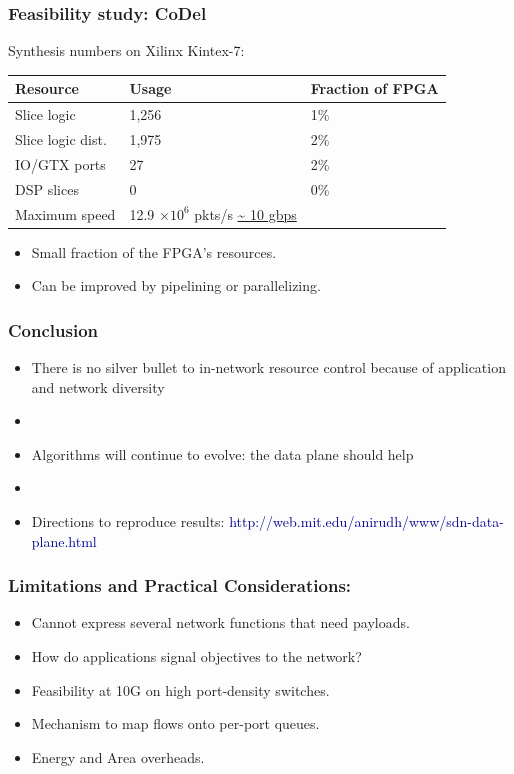 \begin{Large}
\begin{frame}[plain]
\frametitle{Feasibility study: CoDel}
\begin{center}
Synthesis numbers on Xilinx Kintex-7: \\
\begin{tabular}{lll}
\bf Resource & \bf Usage & \bf Fraction of FPGA \\
\hline Slice logic & 1,256 & 1\% \\
Slice logic dist. & 1,975 & 2\% \\
IO/GTX ports & 27 & 2\% \\
DSP slices & 0 & 0\% \\
Maximum speed & 12.9 $\times 10^6$ pkts/s \url{~ 10 gbps} \\
\end{tabular}
\end{center}
\begin{itemize}
\item Small fraction of the FPGA's resources.
\item Can be improved by pipelining or parallelizing.
\end{itemize}
\end{frame}

\begin{frame}[plain]

\frametitle{Conclusion}
\begin{itemize}

\item There is no silver bullet to in-network resource control because
  of application and network diversity

\item[]
\item Algorithms will continue to evolve: the data plane should help

\item[]
\item Directions to reproduce results: \textcolor{DarkBlue}{http://web.mit.edu/anirudh/www/sdn-data-plane.html} 

\end{itemize}
\end{frame}


\begin{frame}[plain]
\frametitle{Limitations and Practical Considerations:}
\begin{itemize}
\item Cannot express several network functions that need payloads.
\item How do applications signal objectives to the network?
\item Feasibility at 10G on high port-density  switches.
\item Mechanism to map flows onto per-port queues.
\item Energy and Area overheads.
\end{itemize}
\end{frame}


\end{Large}
